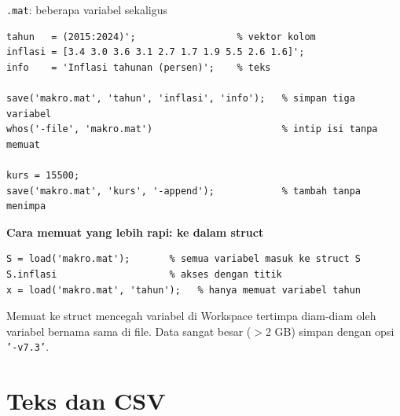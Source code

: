 \documentclass[10pt,aspectratio=169]{beamer}
\newcommand{\kode}[1]{\texttt{\small #1}}
\begin{document}
\begin{frame}[fragile]{\kode{.mat}: beberapa variabel sekaligus}
\begin{lstlisting}
tahun   = (2015:2024)';                  % vektor kolom
inflasi = [3.4 3.0 3.6 3.1 2.7 1.7 1.9 5.5 2.6 1.6]';
info    = 'Inflasi tahunan (persen)';    % teks

save('makro.mat', 'tahun', 'inflasi', 'info');   % simpan tiga variabel
whos('-file', 'makro.mat')                       % intip isi tanpa memuat

kurs = 15500;
save('makro.mat', 'kurs', '-append');            % tambah tanpa menimpa
\end{lstlisting}
  \textbf{Cara memuat yang lebih rapi: ke dalam struct}
\begin{lstlisting}
S = load('makro.mat');       % semua variabel masuk ke struct S
S.inflasi                    % akses dengan titik
x = load('makro.mat', 'tahun');   % hanya memuat variabel tahun
\end{lstlisting}
  \footnotesize Memuat ke struct mencegah variabel di Workspace \alert{tertimpa diam-diam} oleh variabel bernama sama di file.
  Data sangat besar ($>$2 GB) simpan dengan opsi \kode{'-v7.3'}.
\end{frame}

\section{Teks dan CSV}
\end{document}
